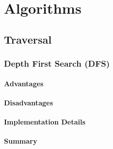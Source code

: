 


\section{Algorithms}






\subsection{Traversal}


\subsubsection{Depth First Search (DFS)}

\paragraph{Advantages}
\paragraph{Disadvantages}

\paragraph{Implementation Details}

\paragraph{Summary}

